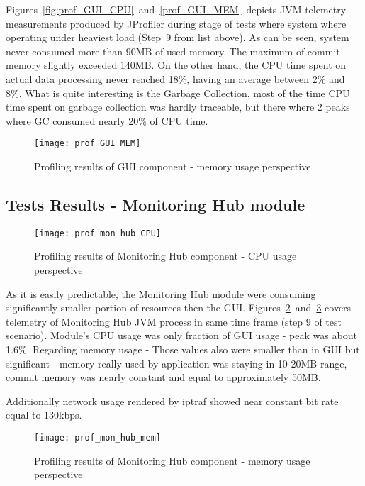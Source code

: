 Figures~\ref{fig:prof_GUI_CPU}~and~\ref{prof_GUI_MEM}~depicts JVM telemetry measurements produced by JProfiler during stage of tests where system where operating under heaviest load (Step~9 from list above). As can be seen, system never consumed more than 90MB of used memory. The maximum of commit memory slightly exceeded 140MB. On the other hand, the CPU time spent on actual data processing  never reached 18\%, having an average between 2\% and 8\%. What is quite interesting is the Garbage Collection, most of the time CPU time spent on garbage collection was hardly traceable, but there where 2 peaks where GC consumed nearly 20\% of CPU time. 


\begin{figure}[ht]
  \centering
  \texttt{[image: prof\_GUI\_MEM]}
  \caption{Profiling results of GUI component - memory usage perspective}
  \label{fig:prof_GUI_MEM}
\end{figure}

\subsection{Tests Results - Monitoring Hub module}

\begin{figure}[ht]
  \centering
  \texttt{[image: prof\_mon\_hub\_CPU]}
  \caption{Profiling results of Monitoring Hub component - CPU usage perspective}
  \label{fig:prof_mon_hub_CPU}
\end{figure}


As it is easily predictable, the Monitoring Hub module were consuming significantly smaller portion of resources then the GUI. Figures~\ref{fig:prof_mon_hub_CPU}~and~\ref{fig:prof_mon_hub_mem} covers telemetry of Monitoring Hub JVM process in same time frame (step 9 of test scenario). Module\rq{}s CPU usage was only fraction of GUI usage - peak was about 1.6\%. Regarding memory usage - Those values also were smaller than in GUI but significant - memory really used by application was staying in 10-20MB range, commit memory was nearly constant and equal to approximately 50MB.

Additionally network usage rendered by iptraf showed near constant bit rate equal to 130kbps.

\begin{figure}[ht]
  \centering
  \texttt{[image: prof\_mon\_hub\_mem]}
  \caption{Profiling results of Monitoring Hub component - memory usage perspective}
  \label{fig:prof_mon_hub_mem}
\end{figure}


